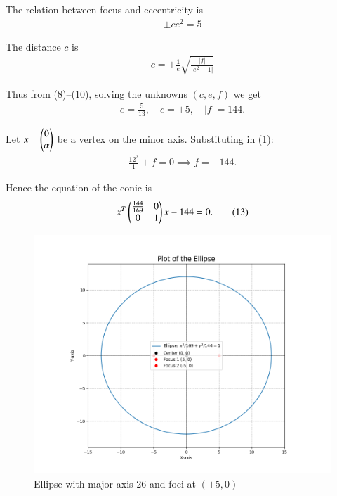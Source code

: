 \documentclass[journal]{IEEEtran}
\begin{document}
The relation between focus and eccentricity is
\begin{align}
\pm ce^2 = 5 \tag{9}
\end{align}

The distance $c$ is
\begin{align}
c = \pm \frac{1}{e}\sqrt{\frac{|f|}{|e^2-1|}} \tag{10}
\end{align}

Thus from (8)--(10), solving the unknowns $(c,e,f)$ we get
\begin{align}
e = \tfrac{5}{13},\quad c = \pm 5, \quad |f| = 144. \tag{11}
\end{align}

Let $x=\begin{pmatrix}0\\\alpha\end{pmatrix}$ be a vertex on the minor axis. Substituting in (1):
\begin{align}
\frac{12^2}{1} + f = 0 \implies f=-144. \tag{12}
\end{align}

Hence the equation of the conic is
\begin{align*}
x^T \begin{pmatrix}\tfrac{144}{169} & 0 \\ 0 & 1\end{pmatrix} x - 144 = 0. \tag{13}
\end{align*}

\begin{figure}[H]
    \centering
    \includegraphics[width=0.9\linewidth]{figs/fig3.png}
    \caption{Ellipse with major axis $26$ and foci at $(\pm 5,0)$}
    \label{fig:ellipse}
\end{figure}
\end{document}

